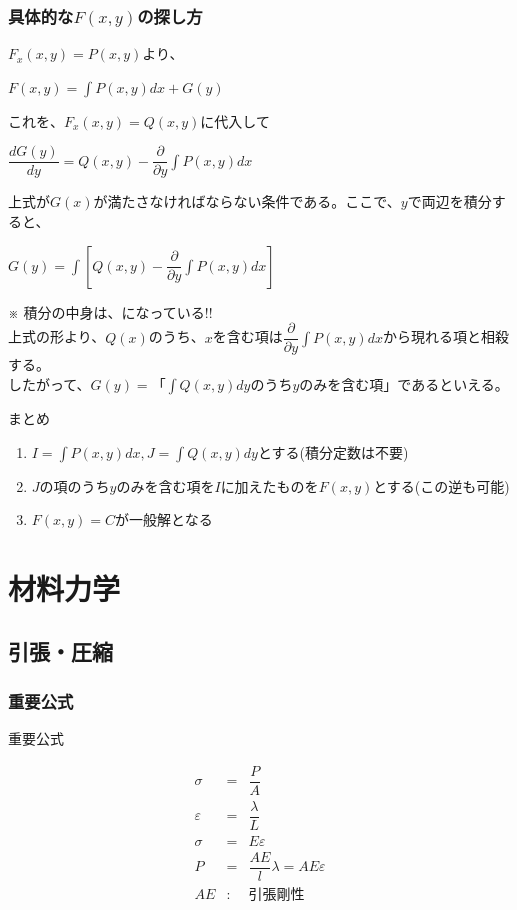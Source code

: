 \documentclass[a4paper]{jsarticle}
\begin{document}
\subsubsection{具体的な$F\left(x,y\right)$の探し方}
$F_x\left(x,y\right)=P\left(x,y\right)$より、
\begin{center}
    $F\left(x,y\right)=\displaystyle\int P\left(x,y\right)dx+G\left(y\right)$
\end{center}
これを、$F_x\left(x,y\right)=Q\left(x,y\right)$に代入して
\begin{center}
    $\displaystyle\dfrac{dG\left(y\right)}{dy}=Q\left(x,y\right)-\dfrac{\partial}{\partial y}\int P\left(x,y\right)dx$
\end{center}
上式が$G\left(x\right)$が満たさなければならない条件である。ここで、$y$で両辺を積分すると、
\begin{center}
    $\displaystyle G\left(y\right)=\int \left[Q\left(x,y\right)-\dfrac{\partial}{\partial y}\int P\left(x,y\right)dx\right]$
\end{center}
※ 積分の中身は、になっている!!\\
上式の形より、$Q\left(x\right)$のうち、$x$を含む項は$\dfrac{\partial}{\partial y}\int P\left(x,y\right)dx$から現れる項と相殺する。\\
したがって、$G\left(y\right)=$「$\int Q\left(x,y\right)dy$のうち$y$のみを含む項」であるといえる。
\begin{itembox}[l]{まとめ}
    \begin{enumerate}[(1)]
        \item $I=\int P\left(x,y\right)dx,J=\int Q\left(x,y\right)dy$とする(積分定数は不要)
        \item $J$の項のうち$y$のみを含む項を$I$に加えたものを$F\left(x,y\right)$とする(この逆も可能)
        \item $F\left(x,y\right)=C$が一般解となる
    \end{enumerate}
\end{itembox}
\newpage
\section{材料力学}
\subsection{引張・圧縮}
\subsubsection{重要公式}
\begin{itembox}[l]{重要公式}
    \begin{center}
        \begin{eqnarray*}
            \sigma&=&\dfrac{P}{A}\\
            \varepsilon&=&\dfrac{\lambda}{L}\\
            \sigma&=&E\varepsilon\\
            P&=&\dfrac{AE}{l}\lambda=AE\varepsilon\\
            AE&:&引張剛性
        \end{eqnarray*}
    \end{center}
\end{itembox}
\end{document}
